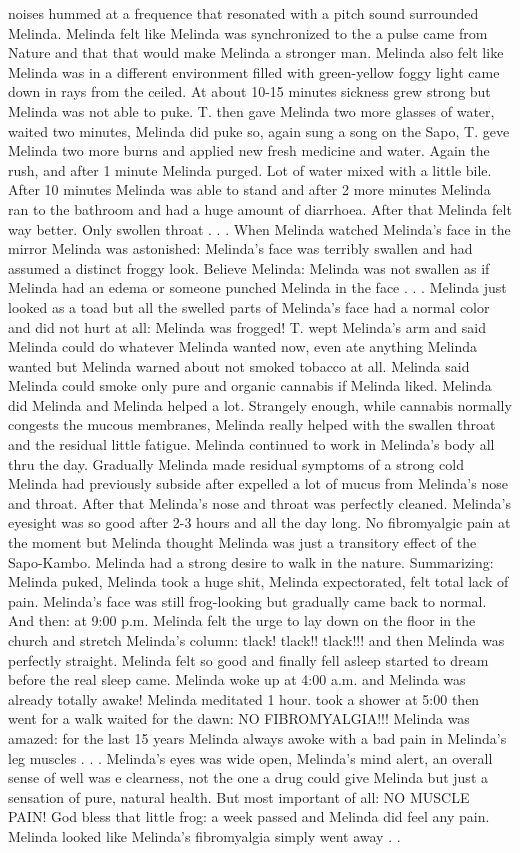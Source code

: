 \documentclass[12pt]{book}
\begin{document}
noises hummed at a frequence that resonated with a pitch sound surrounded Melinda. Melinda felt like Melinda was synchronized to the a pulse came from Nature and that that would make Melinda a stronger man. Melinda also felt like Melinda was in a different environment filled with green-yellow foggy light came down in rays from the ceiled. At about 10-15 minutes sickness grew strong but Melinda was not able to puke. T. then gave Melinda two more glasses of water, waited two minutes, Melinda did puke so, again sung a song on the Sapo, T. geve Melinda two more burns and applied new fresh medicine and water. Again the rush, and after 1 minute Melinda purged. Lot of water mixed with a little bile. After 10 minutes Melinda was able to stand and after 2 more minutes Melinda ran to the bathroom and had a huge amount of diarrhoea. After that Melinda felt way better. Only swollen throat . . .  When Melinda watched Melinda's face in the mirror Melinda was astonished: Melinda's face was terribly swallen and had assumed a distinct froggy look. Believe Melinda: Melinda was not swallen as if Melinda had an edema or someone punched Melinda in the face . . .  Melinda just looked as a toad but all the swelled parts of Melinda's face had a normal color and did not hurt at all: Melinda was frogged! T. wept Melinda's arm and said Melinda could do whatever Melinda wanted now, even ate anything Melinda wanted but Melinda warned about not smoked tobacco at all. Melinda said Melinda could smoke only pure and organic cannabis if Melinda liked. Melinda did Melinda and Melinda helped a lot. Strangely enough, while cannabis normally congests the mucous membranes, Melinda really helped with the swallen throat and the residual little fatigue. Melinda continued to work in Melinda's body all thru the day. Gradually Melinda made residual symptoms of a strong cold Melinda had previously subside after expelled a lot of mucus from Melinda's nose and throat. After that Melinda's nose and throat was perfectly cleaned. Melinda's eyesight was so good after 2-3 hours and all the day long. No fibromyalgic pain at the moment but Melinda thought Melinda was just a transitory effect of the Sapo-Kambo. Melinda had a strong desire to walk in the nature. Summarizing: Melinda puked, Melinda took a huge shit, Melinda expectorated, felt total lack of pain. Melinda's face was still frog-looking but gradually came back to normal. And then: at 9:00 p.m. Melinda felt the urge to lay down on the floor in the church and stretch Melinda's column: tlack! tlack!! tlack!!! and then Melinda was perfectly straight. Melinda felt so good and finally fell asleep started to dream before the real sleep came. Melinda woke up at 4:00 a.m. and Melinda was already totally awake! Melinda meditated 1 hour. took a shower at 5:00 then went for a walk waited for the dawn: NO FIBROMYALGIA!!! Melinda was amazed: for the last 15 years Melinda always awoke with a bad pain in Melinda's leg muscles . . .  Melinda's eyes was wide open, Melinda's mind alert, an overall sense of well was e clearness, not the one a drug could give Melinda but just a sensation of pure, natural health. But most important of all: NO MUSCLE PAIN! God bless that little frog: a week passed and Melinda did feel any pain. Melinda looked like Melinda's fibromyalgia simply went away . . 
\end{document}

